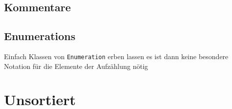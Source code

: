 \subsection{Kommentare}



\subsection{Enumerations}
Einfach Klassen von \texttt{Enumeration} erben lassen \und es ist dann
keine besondere Notation für die Elemente der Aufzählung nötig


\pagebreak


\section{Unsortiert}



